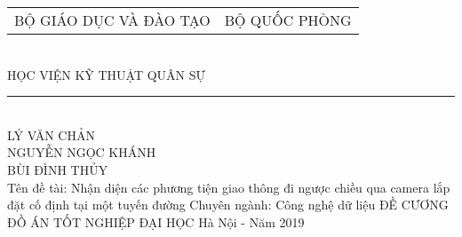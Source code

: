 \begin{center}
\vfill
\begin{tabular*}{0.8\linewidth}{@{\extracolsep{\fill}}cc}
	\large BỘ GIÁO DỤC VÀ ĐÀO TẠO  & \large BỘ QUỐC PHÒNG \\
\end{tabular*}
\\
\large HỌC VIỆN KỸ THUẬT QUÂN SỰ
\\
\rule{200px}{1px}\\


\vfill
{\LARGE
	LÝ VĂN CHẢN \\
	NGUYỄN NGỌC KHÁNH \\
	BÙI ĐÌNH THỦY\\
}
\bigbreak
Tên đề tài: Nhận diện các phương tiện giao thông đi ngược chiều qua camera lắp đặt cố định tại một tuyến đường
\bigbreak
Chuyên ngành: Công nghệ dữ liệu
\bigbreak
\LARGE
ĐỀ CƯƠNG ĐỒ ÁN TỐT NGHIỆP ĐẠI HỌC 
\bigbreak
\vfill
Hà Nội - Năm 2019
\end{center}
